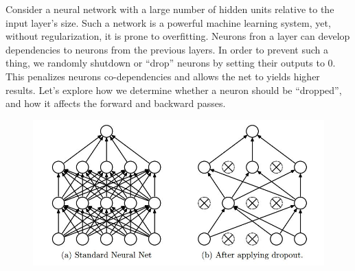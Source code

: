 Consider a neural network with a large number of hidden units relative to the input layer's size.
Such a network is a powerful machine learning system, yet, without regularization, it is prone to overfitting.
Neurons fron a layer can develop dependencies to neurons from the previous layers.
In order to prevent such a thing, we randomly shutdown or ``drop'' neurons by setting their outputs to 0.
This penalizes neurons co-dependencies and allows the net to yields higher results.
Let's explore how we determine whether a neuron should be ``dropped'', and how it affects the forward and backward passes.


\begin{figure}[!ht]
    \centering
    {{\includegraphics[scale = 0.50]{src/diagrams/dropout.png}}}  
\end{figure}

